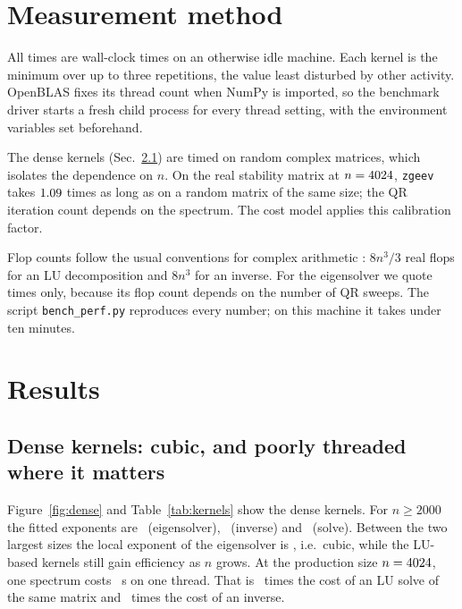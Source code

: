 \documentclass[pre,twocolumn,superscriptaddress,longbibliography]{revtex4-2}
\begin{document}
\section{Measurement method}\label{sec:method}
All times are wall-clock times on an otherwise idle machine. Each kernel is the minimum over up to
three repetitions, the value least disturbed by other activity. OpenBLAS fixes its thread count
when NumPy is imported, so the benchmark driver starts a fresh child process for every thread
setting, with the environment variables set beforehand.

The dense kernels (Sec.~\ref{sec:dense}) are timed on random complex matrices, which isolates the
dependence on $n$. On the real stability matrix at $n=4024$, \texttt{zgeev} takes $1.09$ times
as long as on a random matrix of the same size; the QR iteration count depends on the spectrum. The
cost model applies this calibration factor.

Flop counts follow the usual conventions for complex arithmetic \cite{GolubVanLoan}: $8n^3/3$ real
flops for an LU decomposition and $8n^3$ for an inverse. For the eigensolver we quote times only,
because its flop count depends on the number of QR sweeps. The script \texttt{bench\_perf.py}
reproduces every number; on this machine it takes under ten minutes.

\section{Results}\label{sec:results}

\subsection{Dense kernels: cubic, and poorly threaded where it matters}\label{sec:dense}
Figure~\ref{fig:dense} and Table~\ref{tab:kernels} show the dense kernels. For $n\ge2000$ the
fitted exponents are \pEig\ (eigensolver), \pInv\ (inverse) and \pSolve\ (solve). Between the two
largest sizes the local exponent of the eigensolver is \pEigLocal, i.e.\ cubic, while the LU-based
kernels still gain efficiency as $n$ grows. At the production size $n=4024$, one spectrum costs
\tEigOne~s on one thread. That is \ratioEigSolve\ times the cost of an LU solve of the same matrix
and \ratioEigInv\ times the cost of an inverse.
\end{document}
